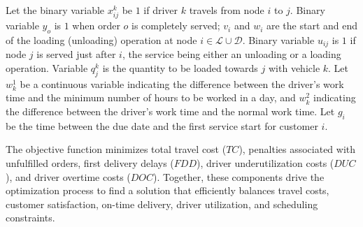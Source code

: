 \documentclass{article}
\begin{document}
Let the binary variable $x^{k}_{ij}$ be $1$ if driver $k$ travels from node $i$ to $j$. Binary variable $y_o$ is $1$ when order $o$ is completely served; $v_i$ and $w_i$ are the start and end of the loading (unloading) operation at node $i \in \mathcal{L}\cup \mathcal{D}$. Binary variable $u_{ij}$ is $1$ if node $j$ is served just after $i$, the service being either an unloading or a loading operation. %
Variable $q^k_j$ is the quantity to be loaded towards $j$ with vehicle $k$. Let $w^1_k$ be a continuous variable indicating the difference between the driver's work time and the minimum number of hours to be worked in a day, and $w^2_k$ indicating the difference between the driver's work time and the normal work time. Let $g_i$ be the time between the due date and the first service start for customer $i$.

The objective function minimizes total travel cost ($TC$), penalties associated with unfulfilled orders, first delivery delays ($FDD$), driver underutilization costs ($DUC$), and driver overtime costs ($DOC$). Together, these components drive the optimization process to find a solution that efficiently balances travel costs, customer satisfaction, on-time delivery, driver utilization, and scheduling constraints.
\end{document}
